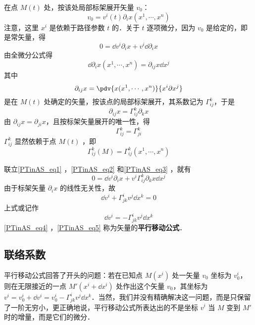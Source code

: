 在点 $M(t)$ 处，按该处局部标架展开矢量 $v_0$：
\begin{equation}
v_0=v^i(t)\partial_i x(x^1,\cdots,x^n)
\end{equation}
注意，这里 $x^i$ 是依赖于路径参数 $t$ 的．关于 $t$ 逐项微分，因为 $v_0$ 是给定的，即是常矢量，得
\begin{equation}\label{PTinAS_eq1}
0=\dd v^i\partial_i x+v^i\dd \partial_i x
\end{equation}
由全微分公式得
\begin{equation}\label{PTinAS_eq2}
\dd \partial_i x(x^1,\cdots,x^n)=\partial_{ij}x\dd x^j
\end{equation}
其中
\begin{equation}
\partial_{ij}x=\pdv{x(x^1,\cdots,x^n)}{x^i\partial x^j}
\end{equation}
是在 $M(t)$ 处确定的矢量，按该点的局部标架展开，其系数记为 $\Gamma^k_{ij}$，于是
\begin{equation}\label{PTinAS_eq3}
\partial_{ij}x=\Gamma^k_{ij}\partial_k x
\end{equation}
由 $\partial_{ij} x=\partial_{ji} x$，且按标架矢量展开的唯一性，得
\begin{equation}
\Gamma^k_{ij}=\Gamma^k_{ji}
\end{equation}
 $\Gamma^k_{ij}$ 显然依赖于点 $M(t)$ ，即
 \begin{equation}
 \Gamma^k_{ij}(M)=\Gamma^k_{ij}(x^1,\cdots,x^n)
 \end{equation}
 
联立\autoref{PTinAS_eq1} ，\autoref{PTinAS_eq2} 和\autoref{PTinAS_eq3} ，就有
\begin{equation}
0=\dd v^i\partial_i x+v^i\Gamma^k_{ij}\partial_k x\dd x^j
\end{equation}
由于标架矢量 $\partial_i x$ 的线性无关性，故
\begin{equation}\label{PTinAS_eq4}
\dd v^i+\Gamma^i_{jk}v^j\dd x^k=0
\end{equation}
上式或记作
\begin{equation}\label{PTinAS_eq5}
\dd v^i=-\Gamma^i_{jk}v^j\dd x^k
\end{equation}
\autoref{PTinAS_eq4} ，\autoref{PTinAS_eq5} 称为矢量的\textbf{平行移动公式}．
\subsection{联络系数}
平行移动公式回答了开头的问题：若在已知点 $M(x^i)$ 处一矢量 $v_0$ 坐标为 $v_0^i$，则在无限接近的一点 $M'(x^i+\dd x^i)$ 处作出这个矢量 $v_0$，其坐标为 $v^i=v_0^i+\dd v^i=v_0^i-\Gamma^i_{jk}v^j\dd x^k$．当然，我们并没有精确解决这一问题，而是只保留了一阶无穷小，更正确地说，平行移动公式所表达出的不是坐标 $v^i$ 当 $M$ 变到 $M'$ 时的增量，而是它们的微分．